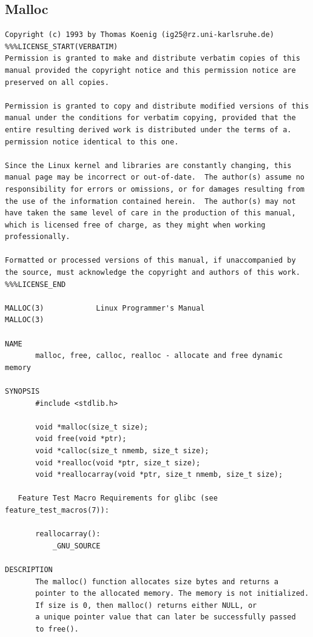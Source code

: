 \subsection{Malloc}\label{man_malloc}

{
\begin{center}
\fontsize{10pt}{10pt}\selectfont

\begin{verbatim}
Copyright (c) 1993 by Thomas Koenig (ig25@rz.uni-karlsruhe.de)
%%%LICENSE_START(VERBATIM)
Permission is granted to make and distribute verbatim copies of this
manual provided the copyright notice and this permission notice are
preserved on all copies.

Permission is granted to copy and distribute modified versions of this
manual under the conditions for verbatim copying, provided that the
entire resulting derived work is distributed under the terms of a.
permission notice identical to this one.

Since the Linux kernel and libraries are constantly changing, this
manual page may be incorrect or out-of-date.  The author(s) assume no
responsibility for errors or omissions, or for damages resulting from
the use of the information contained herein.  The author(s) may not
have taken the same level of care in the production of this manual,
which is licensed free of charge, as they might when working
professionally.

Formatted or processed versions of this manual, if unaccompanied by
the source, must acknowledge the copyright and authors of this work.
%%%LICENSE_END

MALLOC(3)            Linux Programmer's Manual                MALLOC(3) 

NAME
       malloc, free, calloc, realloc - allocate and free dynamic memory

SYNOPSIS
       #include <stdlib.h>

       void *malloc(size_t size);
       void free(void *ptr);
       void *calloc(size_t nmemb, size_t size);
       void *realloc(void *ptr, size_t size);
       void *reallocarray(void *ptr, size_t nmemb, size_t size);

   Feature Test Macro Requirements for glibc (see feature_test_macros(7)):

       reallocarray():
           _GNU_SOURCE

DESCRIPTION
       The malloc() function allocates size bytes and returns a
       pointer to the allocated memory. The memory is not initialized.
       If size is 0, then malloc() returns either NULL, or     
       a unique pointer value that can later be successfully passed
       to free().


\end{verbatim}
\end{center}}
